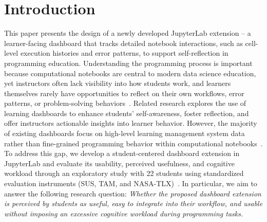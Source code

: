 \documentclass[sigconf]{acmart}
\begin{document}

\maketitle

\section{Introduction}

This paper presents the design of a newly developed JupyterLab extension -- a learner-facing dashboard that tracks detailed notebook interactions, such as cell-level execution histories and error patterns, to support self-reflection in programming education.
Understanding the programming process is important because computational notebooks are central to modern data science education, yet instructors often lack visibility into how students work, and learners themselves rarely have opportunities to reflect on their own workflows, error patterns, or problem-solving behaviors~\cite{perkel2018jupyter, robinson2022error}.
Related research explores the use of learning dashboards to enhance students' self-awareness, foster reflection, and offer instructors actionable insights into learner behavior.
However, the majority of existing dashboards focus on high-level learning management system data rather than fine-grained programming behavior within computational notebooks~\cite{paulsen2024learning}.
To address this gap, we develop a student-centered dashboard extension in JupyterLab and evaluate its usability, perceived usefulness, and cognitive workload through an exploratory study with 22 students using standardized evaluation instruments (SUS, TAM, and NASA-TLX)~\cite{germanupa_sus, davis1989technology, hart1988development}.
In particular, we aim to answer the following research question: \textit{Whether the proposed dashboard extension is perceived by students as useful, easy to integrate into their workflow, and usable without imposing an excessive cognitive workload during programming tasks.}
\end{document}

